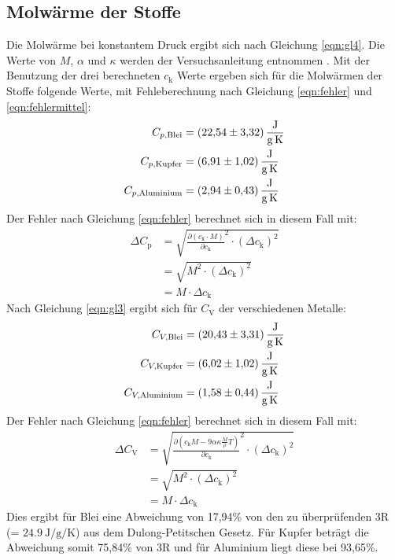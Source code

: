 \subsection{Molwärme der Stoffe}
\label{sec:Molwärme}
Die Molwärme bei konstantem Druck ergibt sich nach Gleichung \eqref{eqn:gl4}.
Die Werte von $M$, $\alpha$ und $\kappa$ werden der Versuchsanleitung entnommen \cite{V201}.
Mit der Benutzung der drei berechneten $c_\text{k}$ Werte ergeben sich für die Molwärmen der Stoffe folgende Werte, mit Fehleberechnung nach Gleichung \eqref{eqn:fehler} und \eqref{eqn:fehlermittel}:
\begin{align*}
  C_{p,\text{Blei}} &= \SI{22,54 \pm 3.32}{\joule\per\gram\per\kelvin}\\
  C_{p,\text{Kupfer}} &= \SI{6,91 \pm 1,02}{\joule\per\gram\per\kelvin}\\
  C_{p,\text{Aluminium}} &= \SI{2,94 \pm 0,43}{\joule\per\gram\per\kelvin}
\end{align*}
Der Fehler nach Gleichung \eqref{eqn:fehler} berechnet sich in diesem Fall mit:
\begin{align*}
  \Delta C_\text{p} &= \sqrt{\frac{\partial (c_\text{k} \cdot M)}{\partial c_\text{k}}^2 \cdot (\Delta c_\text{k})^2} \\
  &= \sqrt{M^2 \cdot (\Delta c_\text{k})^2}\\
  &= M \cdot \Delta c_\text{k}
\end{align*}
Nach Gleichung \eqref{eqn:gl3} ergibt sich für $C_\text{V}$ der verschiedenen Metalle:
\begin{align*}
  C_{V,\text{Blei}} &= \SI{20,43 \pm 3.31}{\joule\per\gram\per\kelvin}\\
  C_{V,\text{Kupfer}} &= \SI{6,02\pm 1,02}{\joule\per\gram\per\kelvin}\\
  C_{V,\text{Aluminium}} &= \SI{1,58 \pm 0,44}{\joule\per\gram\per\kelvin}
\end{align*}
Der Fehler nach Gleichung \eqref{eqn:fehler} berechnet sich in diesem Fall mit:
\begin{align*}
  \Delta C_\text{V} &= \sqrt{\frac{\partial (c_\text{k} M - 9 \alpha \kappa \frac{M}{\rho}T)}{\partial c_\text{k}}^2 \cdot (\Delta c_\text{k})^2} \\
  &= \sqrt{M^2 \cdot (\Delta c_\text{k})^2}\\
  &= M \cdot \Delta c_\text{k}
\end{align*}
Dies ergibt für Blei eine Abweichung von 17,94\% von den zu überprüfenden 3R (= $\SI{24,9}{\joule\per\gram\per\kelvin}$) aus dem Dulong-Petitschen Gesetz.
Für Kupfer beträgt die Abweichung somit 75,84\% von 3R und für Aluminium liegt diese bei 93,65\%.
